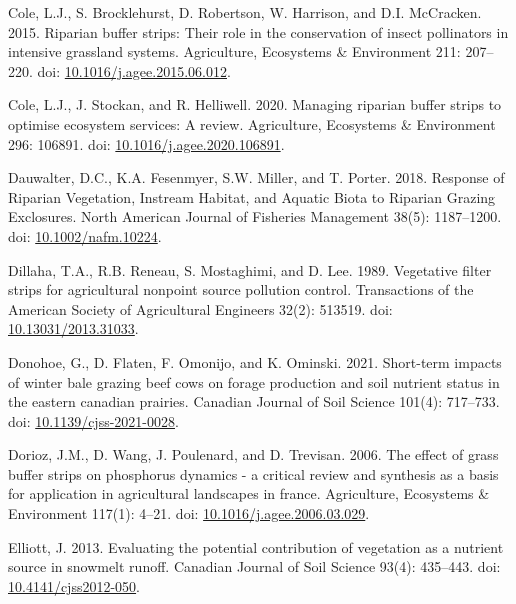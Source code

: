 \documentclass[
]{agujournal2019}
\newlength{\cslhangindent}
\newenvironment{CSLReferences}[2] %
 {\begin{list}{}{%
  \setlength{\itemindent}{0pt}
  \setlength{\leftmargin}{0pt}
  \setlength{\parsep}{0pt}
  \ifodd #1
   \setlength{\leftmargin}{\cslhangindent}
   \setlength{\itemindent}{-1\cslhangindent}
  \fi
  \setlength{\itemsep}{#2\baselineskip}}}
 {\end{list}}
\begin{document}
\begin{CSLReferences}{1}{1}
Cole, L.J., S. Brocklehurst, D. Robertson, W. Harrison, and D.I.
McCracken. 2015. Riparian buffer strips: Their role in the conservation
of insect pollinators in intensive grassland systems. Agriculture,
Ecosystems \& Environment 211: 207--220. doi:
\href{https://doi.org/10.1016/j.agee.2015.06.012}{10.1016/j.agee.2015.06.012}.

Cole, L.J., J. Stockan, and R. Helliwell. 2020. Managing riparian buffer
strips to optimise ecosystem services: A review. Agriculture, Ecosystems
\& Environment 296: 106891. doi:
\href{https://doi.org/10.1016/j.agee.2020.106891}{10.1016/j.agee.2020.106891}.

Dauwalter, D.C., K.A. Fesenmyer, S.W. Miller, and T. Porter. 2018.
Response of Riparian Vegetation, Instream Habitat, and Aquatic Biota to
Riparian Grazing Exclosures. North American Journal of Fisheries
Management 38(5): 1187--1200. doi:
\href{https://doi.org/10.1002/nafm.10224}{10.1002/nafm.10224}.

Dillaha, T.A., R.B. Reneau, S. Mostaghimi, and D. Lee. 1989. Vegetative
filter strips for agricultural nonpoint source pollution control.
Transactions of the American Society of Agricultural Engineers 32(2):
513519. doi:
\href{https://doi.org/10.13031/2013.31033}{10.13031/2013.31033}.

Donohoe, G., D. Flaten, F. Omonijo, and K. Ominski. 2021. Short-term
impacts of winter bale grazing beef cows on forage production and soil
nutrient status in the eastern canadian prairies. Canadian Journal of
Soil Science 101(4): 717--733. doi:
\href{https://doi.org/10.1139/cjss-2021-0028}{10.1139/cjss-2021-0028}.

Dorioz, J.M., D. Wang, J. Poulenard, and D. Trevisan. 2006. The effect
of grass buffer strips on phosphorus dynamics - a critical review and
synthesis as a basis for application in agricultural landscapes in
france. Agriculture, Ecosystems \& Environment 117(1): 4--21. doi:
\href{https://doi.org/10.1016/j.agee.2006.03.029}{10.1016/j.agee.2006.03.029}.

Elliott, J. 2013. Evaluating the potential contribution of vegetation as
a nutrient source in snowmelt runoff. Canadian Journal of Soil Science
93(4): 435--443. doi:
\href{https://doi.org/10.4141/cjss2012-050}{10.4141/cjss2012-050}.


\end{CSLReferences}
\end{document}
